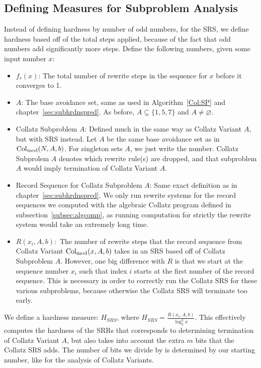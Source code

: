 \subsection{Defining Measures for Subproblem Analysis} \label{subsec:rewritemeasuredefs}
Instead of defining hardness by number of odd numbers, for the SRS, we define hardness based off of the total steps applied, because of the fact that odd numbers add significantly more steps. Define the following numbers, given some input number $x$:
\begin{itemize}
    \item $f_r(x)$: The total number of rewrite steps in the sequence for $x$ before it converges to 1.
    \item $A$: The base avoidance set, same as used in Algorithm~\ref{Col:SP} and chapter~\ref{sec:subhrdnspred}. As before, $A \subseteq \{1, 5, 7\}$ and $A \ne \varnothing$. 
    \item Collatz Subproblem $A$: Defined much in the same way as Collatz Variant $A$, but with SRS instead. Let $A$ be the same base avoidance set as in $\mathrm{Col}_{\text{mod}}(N,A,b)$. For singleton sets $A$, we just write the number. Collatz Subprolem $A$ denotes which rewrite rule(s) are dropped, and that subproblem $A$ would imply termination of Collatz Variant $A$.
    \item Record Sequence for Collatz Subproblem $A$: Same exact definition as in chapter~\ref{sec:subhrdnspred}. We only run rewrite systems for the record sequences we computed with the algebraic Collatz program defined in subsection~\ref{subsec:algcomp}, as running computation for strictly the rewrite system would take an extremely long time.
    \item $R(x_i, A, b):$ The number of rewrite steps that the record sequence from Collatz Variant $\mathrm{Col}_{\text{mod}}(x,A,b)$ takes in an SRS based off of Collatz Subproblem $A$. However, one big difference with $R$ is that we start at the sequence number $x_i$ such that index $i$ starts at the first number of the record sequence. This is necessary in order to correctly run the Collatz SRS for these various subproblems, because otherwise the Collatz SRS will terminate too early.
\end{itemize}
We define a hardness measure: $H_{SRS}$, where $H_{SRS} = \frac{R(x_i, A, b)}{\log_2^2{x}}$. This effectively computes the hardness of the SRRs that corresponds to determining termination of Collatz Variant $A$, but also takes into account the extra $m$ bits that the Collatz SRS adds. The number of bits we divide by is determined by our starting number, like for the analysis of Collatz Variants.

